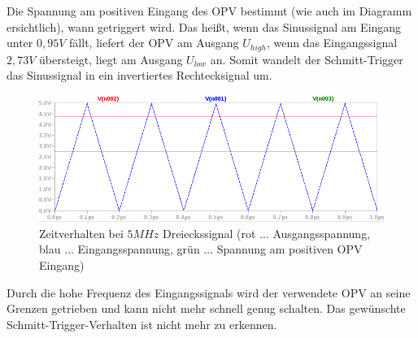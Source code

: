\documentclass[12pt,a4paper,titlepage]{article}
\begin{document}
\noindent Die Spannung am positiven Eingang des OPV bestimmt (wie auch im Diagramm ersichtlich), wann getriggert wird. Das heißt, wenn das Sinussignal am Eingang unter $0,95V$ f\"allt, liefert der OPV am Ausgang $U_{high}$, wenn das Eingangssignal $2,73V$ \"ubersteigt, liegt am Ausgang $U_{low}$ an. Somit wandelt der Schmitt-Trigger das Sinussignal in ein invertiertes Rechtecksignal um.

\begin{figure}[H]
  \centering
  \includegraphics[width=150mm]{schmitt_transient2.png}
  \caption{Zeitverhalten bei $5MHz$ Dreieckssignal (rot $\hdots$ Ausgangsspannung, blau $\hdots$ Eingangsspannung, gr\"un $\hdots$ Spannung am positiven OPV Eingang)}
\end{figure}

\noindent Durch die hohe Frequenz des Eingangssignals wird der verwendete OPV an seine Grenzen getrieben und kann nicht mehr schnell genug schalten. Das gew\"unschte Schmitt-Trigger-Verhalten ist nicht mehr zu erkennen.
\end{document}

